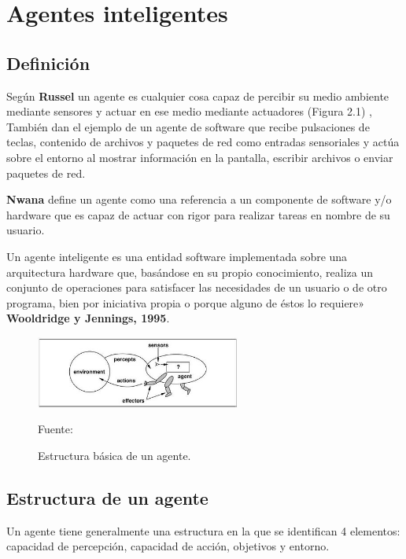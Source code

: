 \section{Agentes inteligentes}
\subsection{Definición}

Según {\bf Russel} un agente es cualquier cosa capaz de percibir su medio ambiente mediante sensores y actuar en ese medio mediante actuadores (Figura 2.1) , También dan el ejemplo de  un agente de software que recibe pulsaciones de teclas, contenido de archivos y paquetes de red como entradas sensoriales y actúa sobre el entorno al mostrar información en la pantalla, escribir archivos o enviar paquetes de red.

{\bf Nwana} define un agente como una referencia a un componente de software y/o hardware que es capaz de actuar con rigor para realizar tareas en nombre de su usuario.

Un agente inteligente es una entidad software implementada sobre una arquitectura hardware que, basándose en su propio conocimiento, realiza un conjunto de operaciones para satisfacer las necesidades de un usuario o de otro programa, bien por iniciativa propia o porque alguno de éstos lo requiere» {\bf Wooldridge y Jennings, 1995}.


\begin{figure}[ht]
\begin{center}
\includegraphics[width=0.6\textwidth]{Imagen2}
\end{center}
\begin{center}
\vskip -0.5cm
\caption{\small{Estructura básica de un agente.}}
{\small{Fuente: \cite{FALTA}}}
\end{center}
\end{figure}


\vskip 3cm

\subsection{Estructura de un agente}

Un agente tiene generalmente una estructura en la que se identifican 4 elementos: capacidad de percepción, capacidad de acción, objetivos y entorno.

